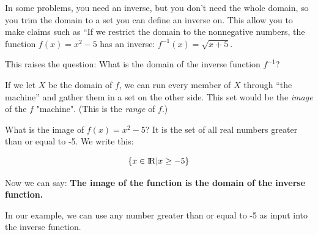 In some problems, you need an inverse, but you don't need the
whole domain, so you trim the domain to a set you can define an
inverse on. This allow you to make claims such as ``If we restrict the domain to
the nonnegative numbers, the function $f(x) = x^2 - 5$ has an inverse:
$f^{-1}(x) =\sqrt{x + 5}$.

This raises the question: What is the domain of the inverse function $f^{-1}$?

If we let $X$ be the domain of $f$, we can run every member of $X$
through ``the machine'' and gather them in a set on the other
side. This set would be the \textit{image} of the $f$ "machine". (This is the \textit{range} of $f$.)

What is the image of $f(x) = x^2 - 5$? It is the set of all real
numbers greater than or equal to -5. We write this:

\begin{equation*}
  \{ x \in {\rm I\!R} | x \geq -5 \}
  \end{equation*}

Now we can say: \textbf{The image of the function is the domain
  of the inverse function.}

In our example, we can use any number greater
than or equal to -5 as input into the inverse function.



